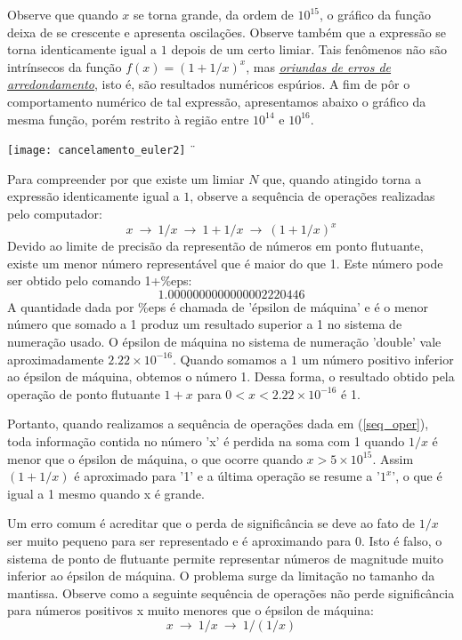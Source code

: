 \begin{ex}
Observe que quando $x$ se torna grande, da ordem de $10^{15}$, o gráfico da função deixa de se crescente e apresenta oscilações.  Observe também que a expressão se torna identicamente igual a $1$ depois de um certo limiar. Tais fenômenos não são intrínsecos da função $f(x)=(1+1/x)^x$, mas \emph{\uline{oriundas de erros de arredondamento}}, isto é, são resultados numéricos espúrios. A fim de pôr o comportamento numérico de tal expressão, apresentamos abaixo o gráfico da mesma função, porém restrito à região entre $10^{14}$ e $10^{16}$.

\texttt{[image: cancelamento\_euler2]}
¨%


Para compreender por que existe um limiar $N$ que, quando atingido torna a expressão identicamente igual a $1$, observe a sequência de operações realizadas pelo computador:
\begin{equation}\label{seq_oper}x~\longrightarrow~ 1/x ~\longrightarrow~ 1+1/x ~\longrightarrow~ (1+1/x)^x\end{equation}
Devido ao limite de precisão da representão de números em ponto flutuante, existe um menor número representável que é maior do que 1. Este número pode ser obtido pelo comando 1+\%eps:
$$1.0000000000000002220446$$
A quantidade dada por \%eps é chamada de 'épsilon de máquina' e é o menor número que somado a 1 produz um resultado superior a 1 no sistema de numeração usado. O épsilon de máquina no sistema de numeração 'double' vale aproximadamente $2.22\times 10^{-16}$.
Quando somamos a $1$ um número positivo inferior ao épsilon de máquina, obtemos o número 1. Dessa forma, o resultado obtido pela operação de ponto flutuante $1+x$ para $0<x<2.22 \times 10^{-16}$ é 1. 

Portanto, quando realizamos a sequência de operações dada em (\ref{seq_oper}), toda informação contida no número 'x' é perdida na soma com 1 quando $1/x$ é menor que o épsilon de máquina, o que ocorre quando $x>5\times 10^{15}$. Assim $(1+1/x)$ é aproximado para '1' e a última operação se resume a '$1^x$', o que é igual a 1 mesmo quando x é grande.

Um erro comum é acreditar que o perda de significância se deve ao fato de $1/x$ ser muito pequeno para ser representado e é aproximando para $0$. Isto é falso, o sistema de ponto de flutuante permite representar números de magnitude muito inferior ao épsilon de máquina. O problema surge da limitação no tamanho da mantissa. Observe como a seguinte sequência de operações não perde significância para números positivos x muito menores que o épsilon de máquina:
\begin{equation}\label{seq_oper2}x~\longrightarrow~ 1/x ~\longrightarrow~ 1/(1/x) \end{equation}
 

\end{ex}
